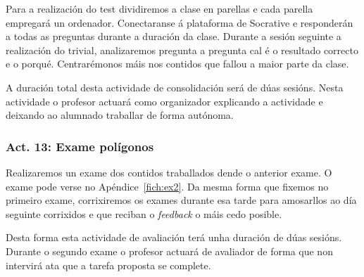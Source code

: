 Para a realización do test dividiremos a clase en parellas e cada parella empregará un ordenador. Conectaranse á plataforma de Socrative e responderán a todas as preguntas durante a duración da clase. Durante a sesión seguinte a realización do trivial, analizaremos pregunta a pregunta cal é o resultado correcto e o porqué. Centrarémonos máis nos contidos que fallou a maior parte da clase.

A duración total desta actividade de consolidación será de dúas sesións. Nesta actividade o profesor actuará como organizador explicando a actividade e deixando ao alumnado traballar de forma autónoma.

\subsubsection{Act. 13: Exame polígonos}\label{act:examen2}
Realizaremos un exame dos contidos traballados dende o anterior exame. O exame pode verse no Apéndice~\ref{fich:ex2}. Da mesma forma que fixemos no primeiro exame, corrixiremos os exames durante esa tarde para amosarllos ao día seguinte corrixidos e que reciban o \emph{feedback} o máis cedo posible.

Desta forma esta actividade de avaliación terá unha duración de dúas sesións. Durante o segundo exame o profesor actuará de avaliador de forma que non intervirá ata que a tarefa proposta se complete.
